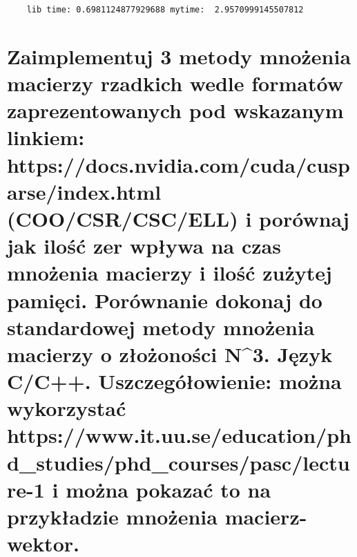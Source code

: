 \begin{lstlisting}
    lib time: 0.6981124877929688 mytime:  2.9570999145507812
\end{lstlisting}
\section{Zaimplementuj 3 metody mnożenia macierzy rzadkich wedle formatów zaprezentowanych pod wskazanym linkiem: https://docs.nvidia.com/cuda/cusparse/index.html (COO/CSR/CSC/ELL) i porównaj jak ilość zer wpływa na czas mnożenia macierzy i ilość zużytej pamięci. Porównanie dokonaj do standardowej metody mnożenia macierzy o złożoności N^3. Język C/C++. Uszczegółowienie: można wykorzystać https://www.it.uu.se/education/phd_studies/phd_courses/pasc/lecture-1 i można pokazać to na przykładzie mnożenia macierz-wektor.
}

